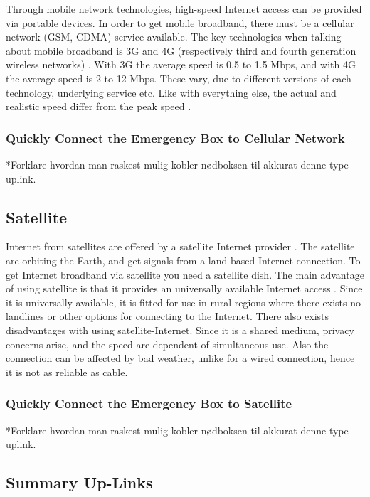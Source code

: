 Through mobile network technologies, high-speed Internet access can be provided via portable devices. In order to get mobile broadband, there must be a cellular network (GSM, CDMA) service available. The key technologies when talking about mobile broadband is 3G and 4G (respectively third and fourth generation wireless networks) \cite{mobilebroadband}. With 3G the average speed is 0.5 to 1.5 Mbps, and with 4G the average speed is 2 to 12 Mbps. These vary, due to different versions of each technology, underlying service etc. Like with everything else, the actual and realistic speed differ from the peak speed \cite{3gvs4g}. 

\subsubsection{Quickly Connect the Emergency Box to Cellular Network}
*Forklare hvordan man raskest mulig kobler nødboksen til akkurat denne type uplink.


\subsection{Satellite}
Internet from satellites are offered by a satellite Internet provider \cite{cablevssatellite}. The satellite are orbiting the Earth, and get signals from a land based Internet connection. To get Internet broadband via satellite you need a satellite dish. The main advantage of using satellite is that it provides an universally available Internet access \cite{broadband}. Since it is universally available, it is fitted for use in rural regions where there exists no landlines or other options for connecting to the Internet. There also exists disadvantages with using satellite-Internet. Since it is a shared medium, privacy concerns arise, and the speed are dependent of simultaneous use. Also the connection can be affected by bad weather, unlike for a wired connection, hence it is not as reliable as cable. 

\subsubsection{Quickly Connect the Emergency Box to Satellite}
*Forklare hvordan man raskest mulig kobler nødboksen til akkurat denne type uplink.

\subsection{Summary Up-Links}

